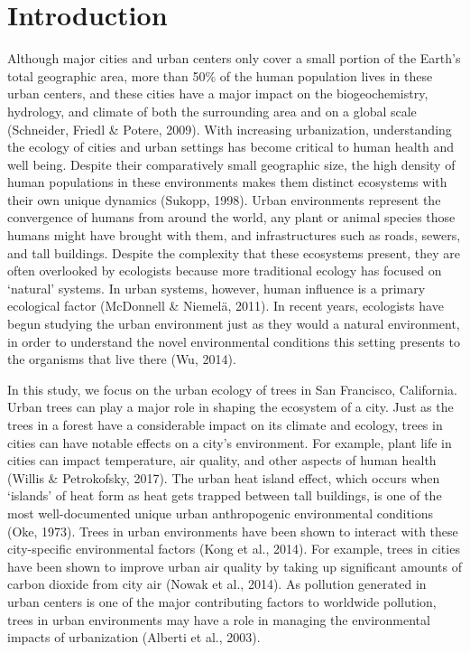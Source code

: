 \documentclass[fleqn,10pt,lineno]{wlpeerj} %
\begin{document}
\hypertarget{introduction}{%
\section*{Introduction}\label{introduction}}

Although major cities and urban centers only cover a small portion of the Earth's total geographic area, more than 50\% of the human population lives in these urban centers, and these cities have a major impact on the biogeochemistry, hydrology, and climate of both the surrounding area and on a global scale (Schneider, Friedl \& Potere, 2009). With increasing urbanization, understanding the ecology of cities and urban settings has become critical to human health and well being. Despite their comparatively small geographic size, the high density of human populations in these environments makes them distinct ecosystems with their own unique dynamics (Sukopp, 1998). Urban environments represent the convergence of humans from around the world, any plant or animal species those humans might have brought with them, and infrastructures such as roads, sewers, and tall buildings. Despite the complexity that these ecosystems present, they are often overlooked by ecologists because more traditional ecology has focused on `natural' systems. In urban systems, however, human influence is a primary ecological factor (McDonnell \& Niemelä, 2011). In recent years, ecologists have begun studying the urban environment just as they would a natural environment, in order to understand the novel environmental conditions this setting presents to the organisms that live there (Wu, 2014).

In this study, we focus on the urban ecology of trees in San Francisco, California. Urban trees can play a major role in shaping the ecosystem of a city. Just as the trees in a forest have a considerable impact on its climate and ecology, trees in cities can have notable effects on a city's environment. For example, plant life in cities can impact temperature, air quality, and other aspects of human health (Willis \& Petrokofsky, 2017). The urban heat island effect, which occurs when `islands' of heat form as heat gets trapped between tall buildings, is one of the most well-documented unique urban anthropogenic environmental conditions (Oke, 1973). Trees in urban environments have been shown to interact with these city-specific environmental factors (Kong et al., 2014). For example, trees in cities have been shown to improve urban air quality by taking up significant amounts of carbon dioxide from city air (Nowak et al., 2014). As pollution generated in urban centers is one of the major contributing factors to worldwide pollution, trees in urban environments may have a role in managing the environmental impacts of urbanization (Alberti et al., 2003).
\end{document}

